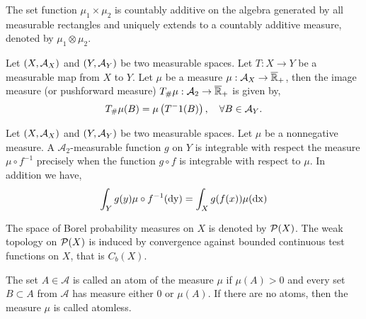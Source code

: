 \begin{theorem}
The set function $\mu_1\times \mu_2$ is countably additive on the algebra generated by all measurable rectangles and uniquely extends to a countably additive measure, denoted by $\mu_1\otimes \mu_2$.
\end{theorem}

\begin{definition}
	Let $\left( X, \mathcal{A}_X \right)$  and $\left( Y, \mathcal{A}_Y \right)$ be two measurable spaces. Let $T:X\rightarrow Y$ be a measurable map from $X$ to $Y$. Let $\mu$ be a measure $\mu: \mathcal{A}_X\rightarrow \overline{\mathbb{R}}_+$, then the image measure (or pushforward measure) ${T}_{\#} \mu:\mathcal{A}_2\rightarrow \overline{\mathbb{R}}_+$ is given by,
	\begin{equation*}
		{T}_{\#} \mu(B) = \mu\left( T^-1(B) \right), \quad \forall B \in \mathcal{A}_Y.
	\end{equation*}
\end{definition}


\begin{theorem}
	Let $\left( X, \mathcal{A}_X \right)$  and $\left( Y, \mathcal{A}_Y \right)$ be two measurable spaces. Let $\mu$ be a nonnegative measure. A $\mathcal{A}_2$-measurable function $g$ on $Y$ is integrable with respect the measure $\mu\circ f^{-1}$ precisely when the function $g\circ f$ is integrable with respect to $\mu$. In addition we have, 
	\begin{equation*}
		\int_Y g(y)\mu\circ f^{-1}(\mathrm{dy}) = \int_X g(f(x))\mu(\mathrm{dx})
	\end{equation*}
\end{theorem}

The space of Borel probability measures on $X$ is denoted by $\mathcal{P}(X)$. The weak topology on $\mathcal{P}(X)$ is induced by convergence against bounded continuous test functions on $X$, that is $C_b(X)$.

\begin{definition}
	The set $A \in \mathcal A$ is called an atom of the measure $\mu$
	if $\mu(A) > 0$ and every set $B \subset A$ from $\mathcal A$ has measure either $0$ or $\mu(A)$. If there are no atoms, then the measure $\mu$ is called atomless. 
\end{definition}

